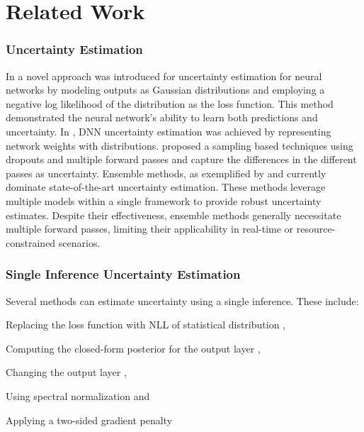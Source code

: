 \documentclass[letterpaper, 10 pt, conference]{ieeeconf}  %
\begin{document}
\section{Related Work}
\label{sec:relatedwork}
\subsubsection*{{\textbf{Uncertainty Estimation}}}
In \cite{nix1994estimating} a novel approach was introduced for uncertainty estimation for neural networks by modeling outputs as Gaussian distributions and employing a negative log likelihood of the distribution as the loss function. This  method demonstrated the neural network's ability to learn both predictions and uncertainty. In \cite{blundell2015weight}, DNN uncertainty estimation was achieved by representing network weights with distributions. \cite{gal_dropout_2016} proposed a sampling based techniques using dropouts and multiple forward passes and capture the differences in the different passes as uncertainty.
Ensemble methods, as exemplified by \cite{lakshminarayanan_simple_2016, dusenberry2020efficient} and \cite{wen2020batchensemble} currently dominate state-of-the-art uncertainty estimation. These methods leverage multiple models within a single framework to provide robust uncertainty estimates. Despite their effectiveness, ensemble methods generally necessitate multiple forward passes, limiting their applicability in real-time or resource-constrained scenarios.
\subsubsection*{{\textbf{Single Inference Uncertainty Estimation}}}
Several methods can estimate uncertainty using a single inference. These include:
\begin{inparaenum}
	\item Replacing the loss function with NLL of statistical distribution \cite{malinin2018predictive, sensoy_evidential_2018, amini_deep_2019, nair_laplace_2O22},
	\item Computing the closed-form posterior for the output layer \cite{Riquelme2018Deep, SnoekRSKSSPPA15},
	\item Changing the output layer \cite{calandra2016manifold, tagasovska2019single}, 
	\item Using spectral normalization \cite{LiuLPTBL20} and
	\item Applying a two-sided gradient penalty  \cite{van2020uncertainty}
\end{inparaenum}
\end{document}
